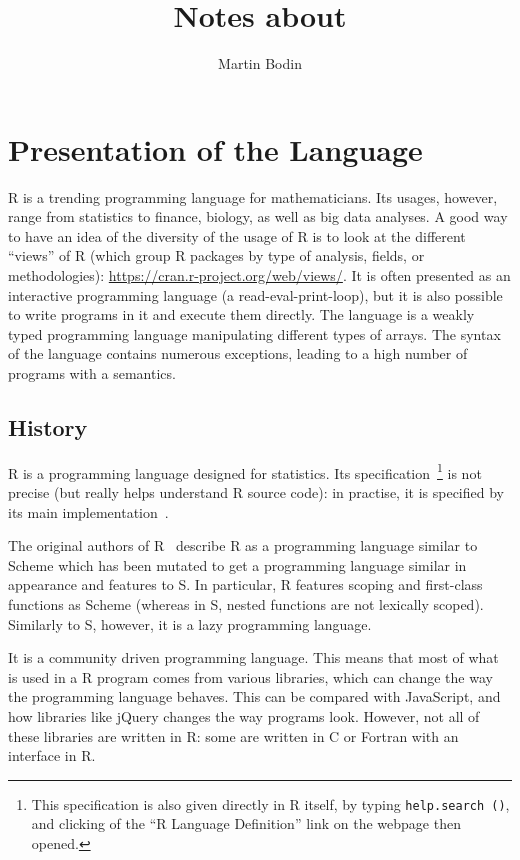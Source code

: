 \documentclass{article}
\title{Notes about \R{}}
\author{Martin Bodin}
\newcommand\R{R}
\newcommand\Cn{C}
\begin{document}
\maketitle

\section{Presentation of the Language}
\label{sec:presentation}

\R{} is a trending programming language for mathematicians.
Its usages, however, range from statistics to finance, biology,
as well as big data analyses.
A good way to have an idea of the diversity of the usage
of \R{} is to look at the different “views” of \R{}
(which group \R{} packages by type of analysis, fields, or methodologies):
\url{https://cran.r-project.org/web/views/}.
It is often presented as an interactive programming language
(a read-eval-print-loop),
but it is also possible to write programs in it and execute them directly.
The language is a weakly typed programming language
manipulating different types of arrays.
The syntax of the language contains numerous exceptions,
leading to a high number of programs with a semantics.

\subsection{History}
\label{sec:history}

\R{} is a programming language designed for statistics.
Its specification~\parencite{team2000r}\footnote{
    This specification is also given directly in \R{} itself,
    by typing \texttt{help.search ()},
    and clicking of the “\R{} Language Definition” link
    on the webpage then opened.
} is not precise (but really helps understand \R{} source code):
in practise, it is specified by its main implementation~\parencite{Rwebsite}.

The original authors of \R{}~\parencite{ihaka1996r}
describe \R{} as a programming language similar to Scheme
which has been mutated to get a programming language similar
in appearance and features to S.
In particular, \R{} features scoping and first-class functions
as Scheme
(whereas in S, nested functions are not lexically scoped).
Similarly to S, however, it is a lazy programming language.

It is a community driven programming language.
This means that most of what is used in a \R{} program comes from various libraries,
which can change the way the programming language behaves.
This can be compared with JavaScript,
and how libraries like jQuery changes the way programs look.
However, not all of these libraries are written in \R{}:
some are written in \Cn{} or Fortran
with an interface in \R{}.
\end{document}
